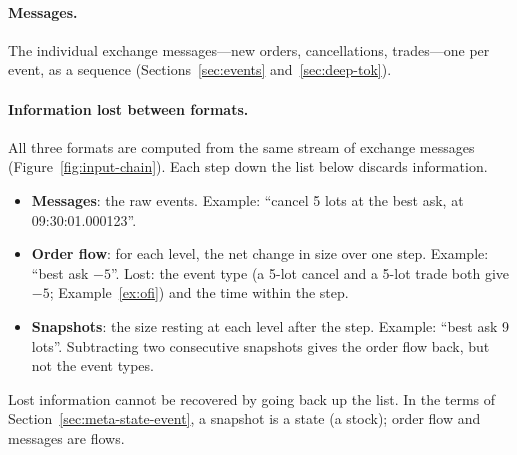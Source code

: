\paragraph{Messages.} The individual exchange messages---new orders, cancellations, trades---one per event, as a
sequence (Sections~\ref{sec:events} and~\ref{sec:deep-tok}).

\paragraph{Information lost between formats.} All three formats are computed from the same stream of exchange
messages (Figure~\ref{fig:input-chain}). Each step down the list below discards information.
\begin{itemize}[leftmargin=1.5em,itemsep=1pt]
\item \textbf{Messages}: the raw events. Example: ``cancel 5 lots at the best ask, at 09:30:01.000123''.
\item \textbf{Order flow}: for each level, the net change in size over one step. Example: ``best ask $-5$''.
  Lost: the event type (a 5-lot cancel and a 5-lot trade both give $-5$; Example~\ref{ex:ofi}) and the
  time within the step.
\item \textbf{Snapshots}: the size resting at each level after the step. Example: ``best ask 9 lots''.
  Subtracting two consecutive snapshots gives the order flow back, but not the event types.
\end{itemize}
Lost information cannot be recovered by going back up the list. In the terms of
Section~\ref{sec:meta-state-event}, a snapshot is a state (a stock); order flow and messages are flows.

